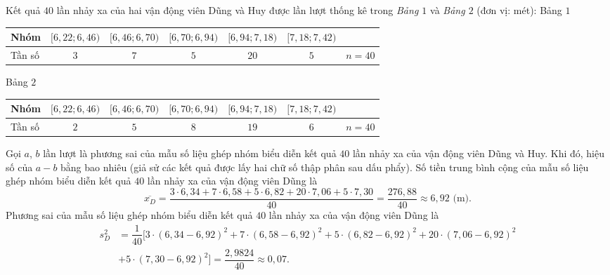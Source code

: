\begin{ex}%
	Kết quả $40$ lần nhảy xa của hai vận động viên Dũng và Huy được lần lượt thống kê trong \textit{Bảng $1$} và \textit{Bảng $2$} (đơn vị: mét):
	Bảng $1$ 
	\begin{center}
		\begin{tabular}{|>{\centering\arraybackslash}m{3cm}|c|c|c|c|c|c|}
			\hline
			Nhóm & $[6{,}22; 6{,}46)$ & $[6{,}46; 6{,}70)$ & $[6{,}70; 6{,}94)$ & $[6{,}94; 7{,}18)$ & $[7{,}18; 7{,}42)$ &   \\ \hline
			Tần số & $3$ & $7$ & $5$ & $20$ & $5$ & $n = 40$ \\ \hline
		\end{tabular} 
	\end{center}
	Bảng $2$
	\begin{center}
		\begin{tabular}{|>{\centering\arraybackslash}m{3cm}|c|c|c|c|c|c|}
			\hline
			Nhóm & $[6{,}22; 6{,}46)$ & $[6{,}46; 6{,}70)$ & $[6{,}70; 6{,}94)$ & $[6{,}94; 7{,}18)$ & $[7{,}18; 7{,}42)$ &   \\ \hline
			Tần số & $2$ & $5$ & $8$ & $19$ & $6$ & $n = 40$ \\ \hline
		\end{tabular} 
	\end{center}
	Gọi $a$, $b$ lần lượt là phương sai của mẫu số liệu ghép nhóm biểu diễn kết quả $40$ lần nhảy xa của vận động viên Dũng và Huy. Khi đó, hiệu số của $a - b$ bằng bao nhiêu (giả sử các kết quả được lấy hai chữ số thập phân sau dấu phẩy).
	\loigiai
	{ Số tiền trung bình cộng của mẫu số liệu ghép nhóm biểu diễn kết quả $40$ lần nhảy xa của vận động viên Dũng là
		\[\overline{x_D} = \dfrac{3 \cdot 6{,}34 + 7 \cdot 6{,}58 + 5 \cdot 6{,}82 + 20 \cdot 7{,}06 + 5 \cdot 7{,}30}{40} = \dfrac{276{,}88}{40} \approx 6{,}92 \text{ (m).}\]
		Phương sai của mẫu số liệu ghép nhóm biểu diễn kết quả $40$ lần nhảy xa của vận động viên Dũng là 
		\begin{align*}
		s_D^2 &= \dfrac{1}{40}\big[3 \cdot (6{,}34 - 6{,}92)^2 + 7 \cdot (6{,}58 - 6{,}92)^2 + 5 \cdot (6{,}82 - 6{,}92)^2 + 20 \cdot (7{,}06 - 6{,}92)^2 \\
		&+ 5 \cdot (7{,}30 - 6{,}92)^2 \big] = \dfrac{2{,}9824}{40} \approx 0{,}07.

\end{align*}}
\end{ex}
